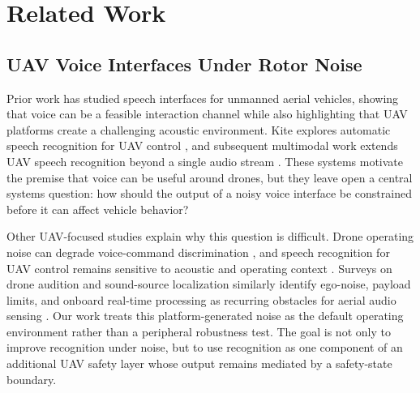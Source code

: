 \section{Related Work}
\label{sec:related}

\subsection{UAV Voice Interfaces Under Rotor Noise}

Prior work has studied speech interfaces for unmanned aerial vehicles, showing that voice can be a feasible interaction channel while also highlighting that UAV platforms create a challenging acoustic environment. Kite explores automatic speech recognition for UAV control \cite{oneata19_interspeech}, and subsequent multimodal work extends UAV speech recognition beyond a single audio stream \cite{oneata2021multimodal}. These systems motivate the premise that voice can be useful around drones, but they leave open a central systems question: how should the output of a noisy voice interface be constrained before it can affect vehicle behavior?

Other UAV-focused studies explain why this question is difficult. Drone operating noise can degrade voice-command discrimination \cite{miesikowska2021uavnoise}, and speech recognition for UAV control remains sensitive to acoustic and operating context \cite{park2023uavvehicle}. Surveys on drone audition and sound-source localization similarly identify ego-noise, payload limits, and onboard real-time processing as recurring obstacles for aerial audio sensing \cite{chevtchenko2025drone_ssl}. Our work treats this platform-generated noise as the default operating environment rather than a peripheral robustness test. The goal is not only to improve recognition under noise, but to use recognition as one component of an additional UAV safety layer whose output remains mediated by a safety-state boundary.

